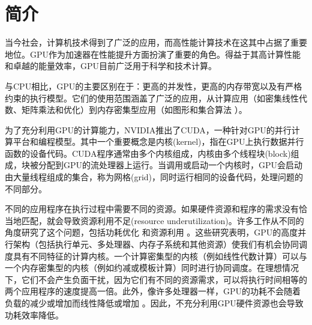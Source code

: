 \chapter{简介}

当今社会，计算机技术得到了广泛的应用，而高性能计算技术在这其中占据了重要地位。GPU作为加速器在性能提升方面扮演了重要的角色。得益于其高计算性能和卓越的能量效率，GPU目前广泛用于科学和技术计算。

与CPU相比，GPU的主要区别在于：更高的并发性，更高的内存带宽以及有严格约束的执行模型。它们的使用范围涵盖了广泛的应用，从计算应用（如密集线性代数\cite{10.5555/1413370.1413402}、矩阵乘法\cite{10.1145/2063384.2063392}和优化\cite{6498575}）到内存密集型应用（如图形和集合算法\cite{Ashkiani_2017} \cite{10.1145/2560040} \cite{10.1007/978-3-662-53455-7_1}）。

为了充分利用GPU的计算能力，NVIDIA推出了CUDA，一种针对GPU的并行计算平台和编程模型。其中一个重要概念是内核(kernel)，指在GPU上执行数据并行函数的设备代码\cite{kernel-def}。CUDA程序通常由多个内核组成，内核由多个线程块(block)组成，块被分配到GPU的流处理器上运行。当调用或启动一个内核时，GPU会启动由大量线程组成的集合，称为网格(grid)，同时运行相同的设备代码，处理问题的不同部分。

不同的应用程序在执行过程中需要不同的资源。如果硬件资源和程序的需求没有恰当地匹配，就会导致资源利用不足(resource underutilization)。许多工作从不同的角度研究了这个问题，包括功耗优化\cite{10.1145/3133560} \cite{10.1145/2611758} \cite{7152947}和资源利用\cite{10.1145/3093336.3037707} \cite{7967160}。这些研究表明，GPU的高度并行架构（包括执行单元、多处理器、内存子系统和其他资源）使我们有机会协同调度具有不同特征的计算内核。一个计算密集型的内核（例如线性代数计算）可以与一个内存密集型的内核（例如约减或模板计算）同时进行协同调度。在理想情况下，它们不会产生负面干扰，因为它们有不同的资源需求，可以将执行时间相等的两个应用程序的速度提高一倍。此外，像许多处理器一样，GPU的功耗不会随着负载的减少或增加而线性降低或增加\cite{10.1145/2636342} \cite{10.1007/s11227-016-1643-9}。因此，不充分利用GPU硬件资源也会导致功耗效率降低。

